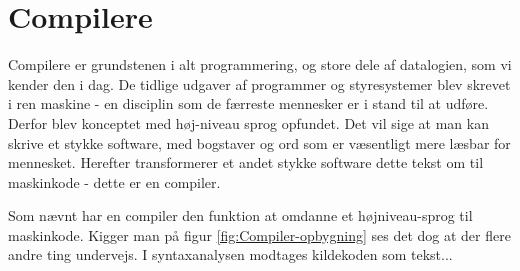 \section{Compilere}
Compilere er grundstenen i alt programmering, og store dele af datalogien, som vi kender den i dag. De tidlige udgaver af programmer og styresystemer blev skrevet i ren maskine - en disciplin som de færreste mennesker er i stand til at udføre. Derfor blev konceptet med høj-niveau sprog opfundet. Det vil sige at man kan skrive et stykke software, med bogstaver og ord som er væsentligt mere læsbar for mennesket. Herefter transformerer et andet stykke software dette tekst om til maskinkode - dette er en compiler.





\noindent Som nævnt har en compiler den funktion at omdanne et højniveau-sprog til maskinkode. Kigger man på figur \ref{fig:Compiler-opbygning} ses det dog at der flere andre ting undervejs.
I syntaxanalysen modtages kildekoden som tekst...